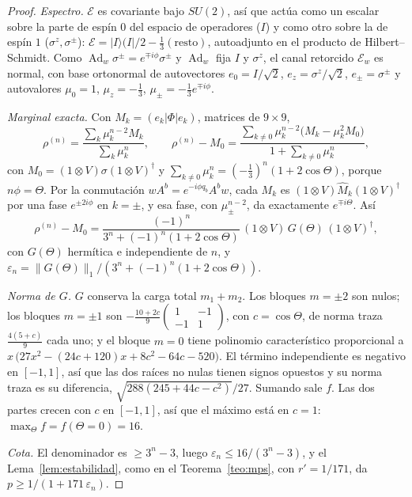 \documentclass[11pt,a4paper]{article}
\theoremstyle{remark}
\newcommand{\Ad}{\operatorname{Ad}}
\newcommand{\ket}[1]{|#1\rangle}
\begin{document}
\begin{proof}
\emph{Espectro.} $\mathcal E$ es covariante bajo $SU(2)$, así que actúa como un escalar sobre la
parte de espín $0$ del espacio de operadores ($I$) y como otro sobre la de espín $1$
($\sigma^z,\sigma^\pm$): $\mathcal E=\ket{I}(I|/2-\tfrac13(\text{resto})$, autoadjunto en el
producto de Hilbert--Schmidt. Como $\Ad_w\sigma^\pm=e^{\mp i\phi}\sigma^\pm$ y $\Ad_w$ fija $I$ y
$\sigma^z$, el canal retorcido $\mathcal E_w$ es normal, con base ortonormal de autovectores
$e_0=I/\sqrt2$, $e_z=\sigma^z/\sqrt2$, $e_\pm=\sigma^\pm$ y autovalores $\mu_0=1$, $\mu_z=-\tfrac13$,
$\mu_\pm=-\tfrac13e^{\mp i\phi}$.

\emph{Marginal exacta.} Con $M_k=(e_k|\Phi|e_k)$, matrices de $9\times9$,
\[
  \rho^{(n)}=\frac{\sum_k\mu_k^{n-2}M_k}{\sum_k\mu_k^n},\qquad
  \rho^{(n)}-M_0=\frac{\sum_{k\neq0}\mu_k^{n-2}\big(M_k-\mu_k^2M_0\big)}{1+\sum_{k\ne0}\mu_k^n},
\]
con $M_0=(1\otimes V)\sigma(1\otimes V)^\dagger$ y $\sum_{k\ne0}\mu_k^n=(-\tfrac13)^n(1+2\cos\Theta)$,
porque $n\phi=\Theta$. Por la conmutación $wA^b=e^{-i\phi q_b}A^bw$, cada $M_k$ es
$(1\otimes V)\widehat M_k(1\otimes V)^\dagger$ por una fase $e^{\pm2i\phi}$ en $k=\pm$, y esa fase,
con $\mu_\pm^{n-2}$, da exactamente $e^{\mp i\Theta}$. Así
\[
  \rho^{(n)}-M_0=\frac{(-1)^n}{3^n+(-1)^n(1+2\cos\Theta)}\,(1\otimes V)\,G(\Theta)\,(1\otimes V)^\dagger,
\]
con $G(\Theta)$ hermítica e independiente de $n$, y $\varepsilon_n=\|G(\Theta)\|_1/(3^n+(-1)^n(1+2\cos\Theta))$.

\emph{Norma de $G$.} $G$ conserva la carga total $m_1+m_2$. Los bloques $m=\pm2$ son nulos; los
bloques $m=\pm1$ son $-\tfrac{10+2c}9\begin{pmatrix}1&-1\\-1&1\end{pmatrix}$, con $c=\cos\Theta$,
de norma traza $\tfrac{4(5+c)}9$ cada uno; y el bloque $m=0$ tiene polinomio característico
proporcional a $x\,\big(27x^2-(24c+120)x+8c^2-64c-520\big)$. El término independiente es negativo en
$[-1,1]$, así que las dos raíces no nulas tienen signos opuestos y su norma traza es su diferencia,
$\sqrt{288(245+44c-c^2)}/27$. Sumando sale $f$. Las dos partes crecen con $c$ en $[-1,1]$, así que
el máximo está en $c=1$: $\max_\Theta f=f(\Theta{=}0)=16$.

\emph{Cota.} El denominador es $\ge3^n-3$, luego $\varepsilon_n\le16/(3^n-3)$, y el
Lema~\ref{lem:estabilidad}, como en el Teorema~\ref{teo:mps}, con $r'=1/171$, da
$p\ge1/(1+171\,\varepsilon_n)$.
\end{proof}
\end{document}
